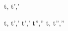 










  {t,\sigma {} t',\sigma'}


  {t,\sigma {} t',\sigma'  \Quad
   t',\sigma' \normalise t'',\sigma''}
  {t,\sigma {} t'',\sigma''}
